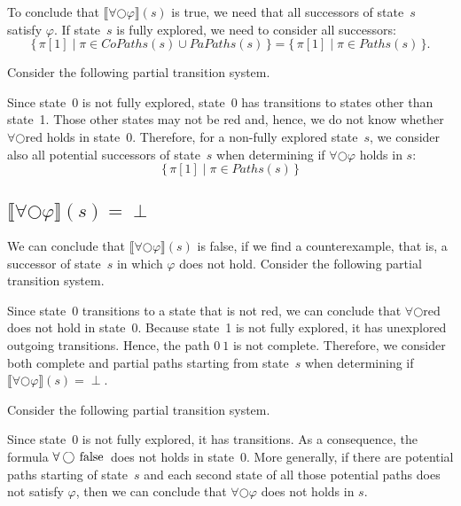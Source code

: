 \documentclass[12pt]{article}
\newcommand{\nxt}{\bigcirc}
\newcommand{\FALSE}{\mbox{\lstinline{false}}}
\theoremstyle{definition}
\newcommand{\satisfaction}[1]{\llbracket #1 \rrbracket}
\begin{document}
To conclude that $\satisfaction{\forall \nxt \varphi}(s)$ is true, we need that all successors of state~$s$ satisfy $\varphi$.  If state~$s$ is fully explored, we need to consider all successors:
\[
\{\, \pi[1] \mid \pi \in \mathit{CoPaths}(s) \cup \mathit{PaPaths}(s) \,\}
= \{\, \pi[1] \mid \pi \in \mathit{Paths}(s) \,\}.
\]

Consider the following partial transition system.
\begin{center}
\end{center}
Since state~0 is not fully explored, state~0 has transitions to states other than state~1.  Those other states may not be red and, hence, we do not know whether  $\forall \nxt \mbox{red}$ holds in state~0.  Therefore, for a non-fully explored state~$s$, we consider also all potential successors of state~$s$ when determining if $\forall \nxt \varphi$ holds in $s$:
\[
\{\, \pi[1] \mid \pi \in \mathit{Paths}(s) \,\}
\]

\subsection*{$\satisfaction{\forall \nxt \varphi}(s) = \perp$}

We can conclude that $\satisfaction{\forall \nxt \varphi}(s)$ is false, if we find a counterexample, that is, a successor of state~$s$ in which $\varphi$ does not hold.  Consider the following partial transition system.
\begin{center}
\end{center}
Since state~0 transitions to a state that is not red, we can conclude that $\forall \nxt \mbox{red}$ does not hold in state~0.  Because state~1 is not fully explored, it has unexplored outgoing transitions.  Hence, the path $0\ 1$ is not complete.  Therefore, we consider both complete and partial paths starting from state~$s$ when determining if $\satisfaction{\forall \nxt \varphi}(s) = \perp$.

Consider the following partial transition system.
\begin{center}
\end{center}
Since state~0 is not fully explored, it has transitions.  As a consequence, the formula $\forall \nxt \FALSE$ does not holds in state~0.  More generally, if there are potential paths starting of state~$s$ and each second state of all those potential paths does not satisfy $\varphi$, then we can conclude that $\forall \nxt \varphi$ does not holds in $s$.
\end{document}
